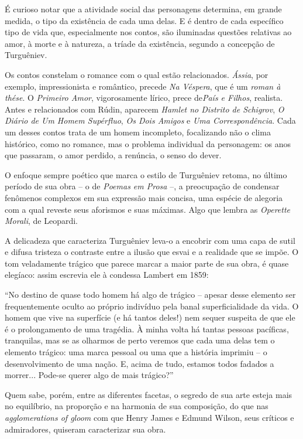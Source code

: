 É curioso notar que a atividade social das personagens determina, em
grande medida, o tipo da existência de cada uma delas. E é dentro de
cada específico tipo de vida que, especialmente nos contos, são
iluminadas questões relativas ao amor, à morte e à natureza, a tríade da
existência, segundo a concepção de Turguêniev.

Os contos constelam o romance com o qual estão relacionados.
\emph{Ássia}, por exemplo, impressionista e romântico, precede \emph{Na
Véspera}, que é um \emph{roman à thése}. O \emph{Primeiro Amor},
vigorosamente lírico, prece de\emph{País e Filhos}, realista. Antes e
relacionados com Rúdin, aparecem \emph{Hamlet no Distrito de Schigrov},
\emph{O Diário de Um Homem Supérfluo}, \emph{Os Dois Amigos} e \emph{Uma
Correspondência}. Cada um desses contos trata de um homem incompleto,
focalizando não o clima histórico, como no romance, mas o problema
individual da personagem: os anos que passaram, o amor perdido, a
renúncia, o senso do dever.

O enfoque sempre poético que marca o estilo de Turguêniev retoma, no
último período de sua obra -- o de \emph{Poemas em Prosa} --, a
preocupação de condensar fenômenos complexos em sua expressão mais
concisa, uma espécie de alegoria com a qual reveste seus aforismos e
suas máximas. Algo que lembra as \emph{Operette Morali}, de Leopardi.

A delicadeza que caracteriza Turguêniev leva-o a encobrir com uma capa
de sutil e difusa tristeza o contraste entre a ilusão que esvai e a
realidade que se impõe. O tom veladamente trágico que parece marcar a
maior parte de sua obra, é quase elegíaco: assim escrevia ele à condessa
Lambert em 1859:

``No destino de quase todo homem há algo de trágico -- apesar desse
elemento ser frequentemente oculto ao próprio indivíduo pela banal
superficialidade da vida. O homem que vive na superfície (e há tantos
deles!) nem sequer suspeita de que ele é o prolongamento de uma
tragédia. À minha volta há tantas pessoas pacíficas, tranquilas, mas se
as olharmos de perto veremos que cada uma delas tem o elemento trágico:
uma marca pessoal ou uma que a história imprimiu -- o desenvolvimento de
uma nação. E, acima de tudo, estamos todos fadados a morrer... Pode-se
querer algo de mais trágico?''

Quem sabe, porém, entre as diferentes facetas, o segredo de sua arte
esteja mais no equilíbrio, na proporção e na harmonia de sua composição,
do que nas \emph{agglomerations of gloom} com que Henry James e Edmund
Wilson, seus críticos e admiradores, quiseram caracterizar sua obra.

